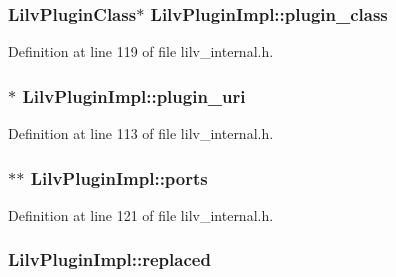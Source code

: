 \subsubsection[{\texorpdfstring{plugin\+\_\+class}{plugin_class}}]{ {\bf Lilv\+Plugin\+Class}$\ast$ Lilv\+Plugin\+Impl\+::plugin\+\_\+class}\hypertarget{struct_lilv_plugin_impl_a5bbafc02157de0f52dcd7bb92a23a547}{}\label{struct_lilv_plugin_impl_a5bbafc02157de0f52dcd7bb92a23a547}


Definition at line 119 of file lilv\+\_\+internal.\+h.

\subsubsection[{\texorpdfstring{plugin\+\_\+uri}{plugin_uri}}]{$\ast$ Lilv\+Plugin\+Impl\+::plugin\+\_\+uri}\hypertarget{struct_lilv_plugin_impl_ab292523dd2e272ac3bedee38d750c955}{}\label{struct_lilv_plugin_impl_ab292523dd2e272ac3bedee38d750c955}


Definition at line 113 of file lilv\+\_\+internal.\+h.

\subsubsection[{\texorpdfstring{ports}{ports}}]{$\ast$$\ast$ Lilv\+Plugin\+Impl\+::ports}\hypertarget{struct_lilv_plugin_impl_ab047415ad765783ae57fbe31cdf9249e}{}\label{struct_lilv_plugin_impl_ab047415ad765783ae57fbe31cdf9249e}


Definition at line 121 of file lilv\+\_\+internal.\+h.

\subsubsection[{\texorpdfstring{replaced}{replaced}}]{ Lilv\+Plugin\+Impl\+::replaced}\hypertarget{struct_lilv_plugin_impl_aa1c8afaa2542c54f9dfd821d118fe7d4}{}\label{struct_lilv_plugin_impl_aa1c8afaa2542c54f9dfd821d118fe7d4}


